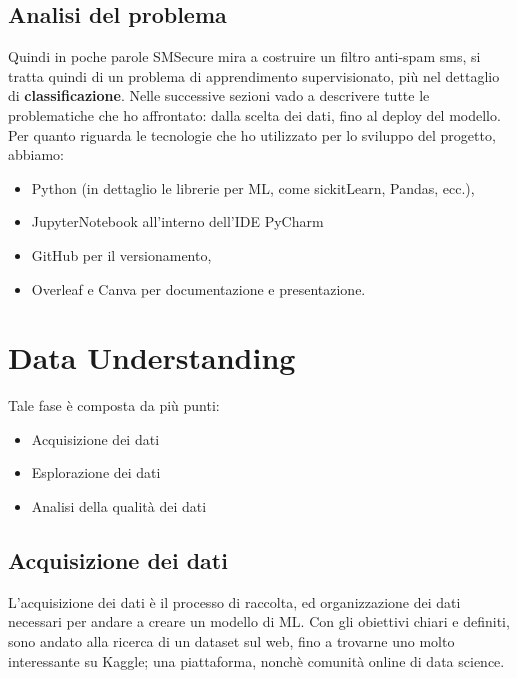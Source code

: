 \documentclass[]{article}
\begin{document}
        \subsection{Analisi del problema}
            Quindi in poche parole SMSecure mira a costruire un filtro anti-spam sms, si tratta quindi di un problema di apprendimento supervisionato, più nel dettaglio di \textbf{classificazione}. Nelle successive sezioni vado a descrivere tutte le problematiche che ho affrontato: dalla scelta dei dati, fino al deploy del modello.\\
            Per quanto riguarda le tecnologie che ho utilizzato per lo sviluppo del progetto, abbiamo:
            \begin{itemize}
                \item Python (in dettaglio le librerie per ML, come sickitLearn, Pandas,  ecc.),
                \item JupyterNotebook all'interno dell'IDE PyCharm
                \item GitHub per il versionamento,
                \item Overleaf e Canva per documentazione e presentazione.
            \end{itemize}
\newpage
\section{Data Understanding}
    Tale fase è composta da più punti:
    \begin{itemize}
        \item Acquisizione dei dati
        \item Esplorazione dei dati
        \item Analisi della qualità dei dati
    \end{itemize}
    \subsection{Acquisizione dei dati}
        L'acquisizione dei dati è il processo di raccolta, ed organizzazione dei dati necessari per andare a creare un modello di ML. Con gli obiettivi chiari e definiti, sono andato alla ricerca di un dataset sul web, fino a trovarne uno molto interessante su Kaggle; una piattaforma, nonchè comunità online di data science. \\
\end{document}
